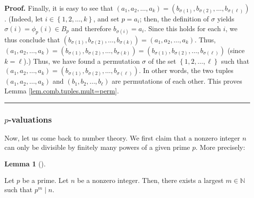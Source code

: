 \documentclass[numbers=enddot,12pt,final,onecolumn,notitlepage]{scrartcl}%
\numberwithin{exer}{subsection}
\theoremstyle{definition}
\newtheorem{lem}[theo]{Lemma}
\newenvironment{lemma}[1][]
{\begin{lem}[#1]\begin{leftbar}}
{\end{leftbar}\end{lem}}
\newenvironment{fineprint}{\begin{small}}{\end{small}}
\newenvironment{proof}[1][Proof]{\noindent\textbf{#1.} }{\ \rule{0.5em}{0.5em}}
\begin{document}
\begin{fineprint}
\begin{proof}
Finally, it is easy to see that $\left(  a_{1},a_{2},\ldots,a_{k}\right)
=\left(  b_{\sigma\left(  1\right)  },b_{\sigma\left(  2\right)  }%
,\ldots,b_{\sigma\left(  \ell\right)  }\right)  $. (Indeed, let $i\in\left\{
1,2,\ldots,k\right\}  $, and set $p=a_{i}$; then, the definition of $\sigma$
yields $\sigma\left(  i\right)  =\phi_{p}\left(  i\right)  \in B_{p}$ and
therefore $b_{\sigma\left(  i\right)  }=a_{i}$. Since this holds for each $i$,
we thus conclude that $\left(  b_{\sigma\left(  1\right)  },b_{\sigma\left(
2\right)  },\ldots,b_{\sigma\left(  k\right)  }\right)  =\left(  a_{1}%
,a_{2},\ldots,a_{k}\right)  $. Thus, $\left(  a_{1},a_{2},\ldots,a_{k}\right)
=\left(  b_{\sigma\left(  1\right)  },b_{\sigma\left(  2\right)  }%
,\ldots,b_{\sigma\left(  k\right)  }\right)  =\left(  b_{\sigma\left(
1\right)  },b_{\sigma\left(  2\right)  },\ldots,b_{\sigma\left(  \ell\right)
}\right)  $ (since $k=\ell$).) Thus, we have found a permutation $\sigma$ of
the set $\left\{  1,2,\ldots,\ell\right\}  $ such that $\left(  a_{1}%
,a_{2},\ldots,a_{k}\right)  =\left(  b_{\sigma\left(  1\right)  }%
,b_{\sigma\left(  2\right)  },\ldots,b_{\sigma\left(  \ell\right)  }\right)
$. In other words, the two tuples $\left(  a_{1},a_{2},\ldots,a_{k}\right)  $
and $\left(  b_{1},b_{2},\ldots,b_{\ell}\right)  $ are permutations of each
other. This proves Lemma \ref{lem.comb.tuples.mult=perm}.
\end{proof}
\end{fineprint}

\subsubsection{$p$-valuations}

Now, let us come back to number theory. We first claim that a nonzero integer
$n$ can only be divisible by finitely many powers of a given prime $p$. More precisely:

\begin{lemma}
\label{lem.ent.prime.vp-wd}Let $p$ be a prime. Let $n$ be a nonzero integer.
Then, there exists a largest $m\in\mathbb{N}$ such that $p^{m}\mid n$.
\end{lemma}
\end{document}
